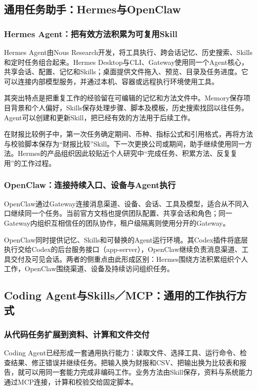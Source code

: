 \subsection{通用任务助手：Hermes与OpenClaw}
\subsubsection{Hermes Agent：把有效方法积累为可复用Skill}
Hermes Agent由Nous Research开发，将工具执行、跨会话记忆、历史搜索、Skills和定时任务组合起来。Hermes Desktop与CLI、Gateway使用同一个Agent核心，共享会话、配置、记忆和Skills；桌面提供文件拖入、预览、目录及任务进度。它可以连接内部模型服务，并通过本机、容器或远程执行环境使用工具。

其突出特点是把重复工作的经验留在可编辑的记忆和方法文件中。Memory保存项目背景和个人偏好，Skills保存处理步骤、脚本及模板，历史搜索找回以往任务。Agent可以创建和更新Skill，把已经有效的方法用于后续工作。

在财报比较例子中，第一次任务确定期间、币种、指标公式和引用格式，再将方法与校验脚本保存为“财报比较”Skill。下一次更换公司或期间，助手继续使用同一方法。Hermes的产品组织因此较贴近个人研究中“完成任务、积累方法、反复复用”的工作过程。

\subsubsection{OpenClaw：连接持续入口、设备与Agent执行}
OpenClaw通过Gateway连接消息渠道、设备、会话、工具及模型，适合从不同入口继续同一个任务。当前官方文档也提供团队配置、共享会话和角色；同一Gateway内组织互相信任的团队协作，租户级隔离则使用分开的Gateway。

OpenClaw同时提供记忆、Skills和可替换的Agent运行环境。其Codex插件将底层执行交给Codex的后台服务接口（app-server），OpenClaw继续负责消息渠道、工具交付及可见会话。两者的侧重点由此形成区别：Hermes围绕方法积累组织个人工作，OpenClaw围绕渠道、设备及持续访问组织任务。

\subsection{Coding Agent与Skills／MCP：通用的工作执行方式}\label{sec:general-execution}
\subsubsection{从代码任务扩展到资料、计算和文件交付}
Coding Agent已经形成一套通用执行能力：读取文件、选择工具、运行命令、检查结果、修正错误并继续任务。把输入换为财报和CSV、把输出换为比较表和报告，就可以用同一套能力完成非编码工作。业务方法由Skill保存，资料与系统能力通过MCP连接，计算和校验交给固定脚本。

